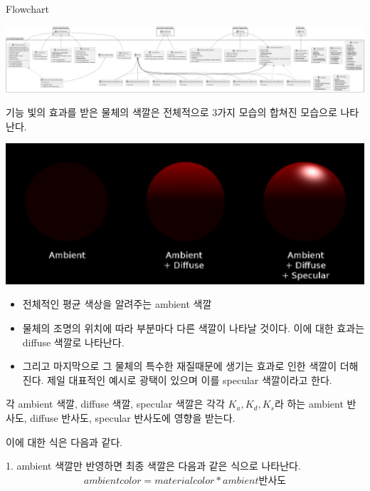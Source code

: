 \documentclass[a0paper,portrait]{baposter}
\begin{document}
\begin{poster}
\begin{posterbox}[name=lists,column=0,below=usage]{Flowchart}
\begin{center}
	\includegraphics[height=0.6\headerheight]{./logo/projectuml.png}
	\label{fig:figlabel}
\end{center}
\end{posterbox}
\begin{posterbox}[name=install,column=0,below=lists]{기능}
빛의 효과를 받은 물체의 색깔은 전체적으로 3가지 모습의 합쳐진 모습으로 나타난다.


\includegraphics[height=1.3\headerheight]{./logo/lambert3.png}
\label{fig:lambert}

\begin{itemize}
	\item 전체적인 평균 색상을 알려주는 ambient 색깔
	\item 물체의 조명의 위치에 따라 부분마다 다른 색깔이 나타날 것이다. 이에 대한 효과는 diffuse 색깔로 나타난다.
	\item 그리고 마지막으로 그 물체의 특수한 재질때문에 생기는 효과로 인한 색깔이 더해진다. 제일 대표적인 예시로 광택이 있으며 이를 specular 색깔이라고 한다.
\end{itemize}
각 ambient 색깔, diffuse 색깔, specular 색깔은 각각 $K_{a}, K_{d}, K_{s}$라 하는 ambient 반사도, diffuse 반사도, specular 반사도에 영향을 받는다. 

이에 대한 식은 다음과 같다.


1. ambient 색깔만 반영하면 최종 색깔은 다음과 같은 식으로 나타난다.
\begin{equation*}
	\begin{split}
		ambient color=material color* ambient 반사도
	\end{split}
\end{equation*}



\end{posterbox}
\end{poster}
\end{document}
